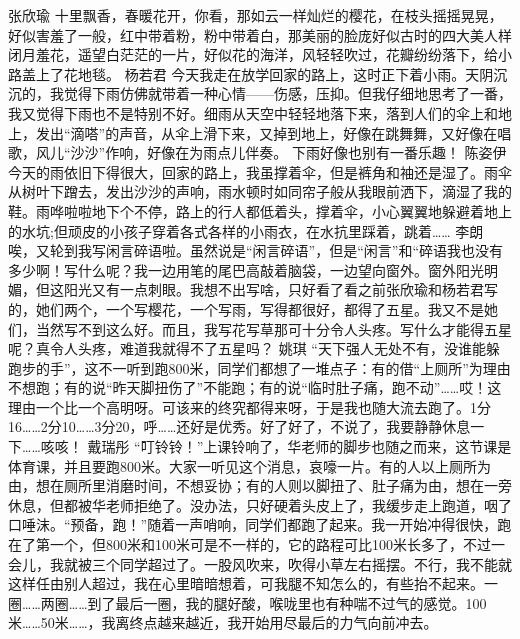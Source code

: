 {}\markdownRendererInterblockSeparator
{}张欣瑜\markdownRendererInterblockSeparator
{}十里飘香，春暖花开，你看，那如云一样灿烂的樱花，在枝头摇摇晃晃，好似害羞了一般，红中带着粉，粉中带着白，那美丽的脸庞好似古时的四大美人样闭月羞花，遥望白茫茫的一片，好似花的海洋，风轻轻吹过，花瓣纷纷落下，给小路盖上了花地毯。\markdownRendererInterblockSeparator
{}\markdownRendererInterblockSeparator
{}杨若君\markdownRendererInterblockSeparator
{}今天我走在放学回家的路上，这时正下着小雨。天阴沉沉的，我觉得下雨仿佛就带着一种心情——伤感，压抑。但我仔细地思考了一番，我又觉得下雨也不是特别不好。细雨从天空中轻轻地落下来，落到人们的伞上和地上，发出“滴嗒”的声音，从伞上滑下来，又掉到地上，好像在跳舞舞，又好像在唱歌，风儿“沙沙”作响，好像在为雨点儿伴奏。\markdownRendererInterblockSeparator
{}下雨好像也别有一番乐趣！ \markdownRendererInterblockSeparator
{}\markdownRendererInterblockSeparator
{}陈姿伊\markdownRendererInterblockSeparator
{}今天的雨依旧下得很大，回家的路上，我虽撑着伞，但是裤角和袖还是湿了。雨伞从树叶下蹭去，发出沙沙的声响，雨水顿时如同帘子般从我眼前洒下，滴湿了我的鞋。雨哗啦啦地下个不停，路上的行人都低着头，撑着伞，小心翼翼地躲避着地上的水坑;但顽皮的小孩子穿着各式各样的小雨衣，在水抗里踩着，跳着……\markdownRendererInterblockSeparator
{}\markdownRendererInterblockSeparator
{}李朗\markdownRendererInterblockSeparator
{}唉，又轮到我写闲言碎语啦。虽然说是“闲言碎语”，但是“闲言”和“碎语我也没有多少啊！写什么呢？我一边用笔的尾巴高敲着脑袋，一边望向窗外。窗外阳光明媚，但这阳光又有一点刺眼。我想不出写啥，只好看了看之前张欣瑜和杨若君写的，她们两个，一个写樱花，一个写雨，写得都很好，都得了五星。我又不是她们，当然写不到这么好。而且，我写花写草那可十分令人头疼。写什么才能得五星呢？真令人头疼，难道我就得不了五星吗？\markdownRendererInterblockSeparator
{}\markdownRendererInterblockSeparator
{}姚琪\markdownRendererInterblockSeparator
{}“天下强人无处不有，没谁能躲跑步的手”，这不一听到跑800米，同学们都想了一堆点子：有的借“上厕所”为理由不想跑；有的说“昨天脚扭伤了”不能跑；有的说“临时肚子痛，跑不动”……哎！这理由一个比一个高明呀。可该来的终究都得来呀，于是我也随大流去跑了。1分16……2分10……3分20，呼……还好是优秀。好了好了，不说了，我要静静休息一下……咳咳！\markdownRendererInterblockSeparator
{}\markdownRendererInterblockSeparator
{}戴瑞彤\markdownRendererInterblockSeparator
{}“叮铃铃！”上课铃响了，华老师的脚步也随之而来，这节课是体育课，并且要跑800米。大家一听见这个消息，哀嚎一片。有的人以上厕所为由，想在厕所里消磨时间，不想妥协；有的人则以脚扭了、肚子痛为由，想在一旁休息，但都被华老师拒绝了。没办法，只好硬着头皮上了，我缓步走上跑道，咽了口唾沫。“预备，跑！”随着一声哨响，同学们都跑了起来。我一开始冲得很快，跑在了第一个，但800米和100米可是不一样的，它的路程可比100米长多了，不过一会儿，我就被三个同学超过了。一股风吹来，吹得小草左右摇摆。不行，我不能就这样任由别人超过，我在心里暗暗想着，可我腿不知怎么的，有些抬不起来。一圈……两圈……到了最后一圈，我的腿好酸，喉咙里也有种喘不过气的感觉。100米……50米……，我离终点越来越近，我开始用尽最后的力气向前冲去。\markdownRendererInterblockSeparator
